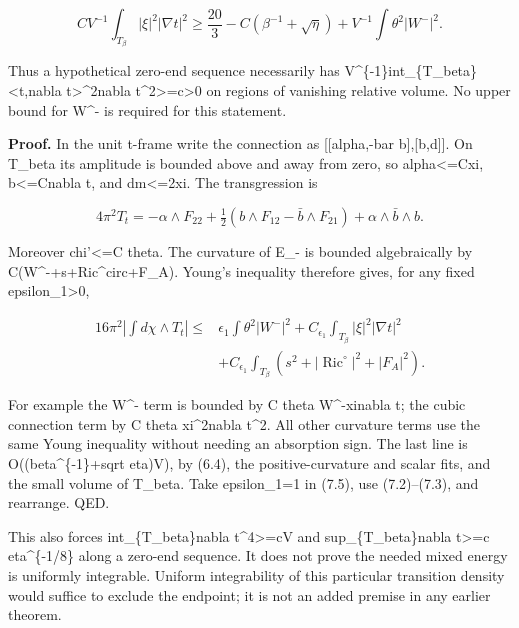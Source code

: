 \documentclass[
  10pt,
]{article}
\begin{document}
\[
 \boxed{C V^{-1}\int_{T_\beta}|\xi|^2|\nabla t|^2
    \ge\frac{20}{3}-C(\beta^{-1}+\sqrt\eta)
                          +V^{-1}\int\theta^2|W^-|^2.}          \tag{7.4}
\]

Thus a hypothetical zero-end sequence necessarily has
V\^{}\{-1\}int\_\{T\_beta\}\textbar\textless t,nabla
t\textgreater\textbar\^{}2\textbar nabla
t\textbar\^{}2\textgreater=c\textgreater0 on regions of vanishing
relative volume. No upper bound for W\^{}- is required for this
statement.

\textbf{Proof.} In the unit t-frame write the connection as
{[}{[}alpha,-bar b{]},{[}b,d{]}{]}. On T\_beta its amplitude is bounded
above and away from zero, so
\textbar alpha\textbar\textless=C\textbar xi\textbar,
\textbar b\textbar\textless=C\textbar nabla t\textbar, and
\textbar dm\textbar\textless=2\textbar xi\textbar. The transgression is

\[
 4\pi^2T_t=-\alpha\wedge F_{22}
   +\tfrac12(b\wedge F_{12}-\bar b\wedge F_{21})
   +\alpha\wedge\bar b\wedge b.
\]

Moreover \textbar chi'\textbar\textless=C theta. The curvature of E\_-
is bounded algebraically by
C(\textbar W\^{}-\textbar+\textbar s\textbar+\textbar Ric\^{}circ\textbar+\textbar F\_A\textbar).
Young's inequality therefore gives, for any fixed
epsilon\_1\textgreater0,

\[
\begin{aligned}
16\pi^2\left|\int d\chi\wedge T_t\right|
 \le{}&\epsilon_1\int\theta^2|W^-|^2
       +C_{\epsilon_1}\int_{T_\beta}|\xi|^2|\nabla t|^2\\
      &+C_{\epsilon_1}\int_{T_\beta}
              (s^2+|\operatorname{Ric}^{\circ}|^2+|F_A|^2).
\end{aligned}                                                     \tag{7.5}
\]

For example the W\^{}- term is bounded by C theta
\textbar W\^{}-\textbar\textbar xi\textbar\textbar nabla t\textbar; the
cubic connection term by C theta \textbar xi\textbar\^{}2\textbar nabla
t\textbar\^{}2. All other curvature terms use the same Young inequality
without needing an absorption sign. The last line is
O((beta\^{}\{-1\}+sqrt eta)V), by (6.4), the positive-curvature and
scalar fits, and the small volume of T\_beta. Take epsilon\_1=1 in
(7.5), use (7.2)--(7.3), and rearrange. QED.

This also forces int\_\{T\_beta\}\textbar nabla
t\textbar\^{}4\textgreater=cV and sup\_\{T\_beta\}\textbar nabla
t\textbar\textgreater=c eta\^{}\{-1/8\} along a zero-end sequence. It
does not prove the needed mixed energy is uniformly integrable. Uniform
integrability of this particular transition density would suffice to
exclude the endpoint; it is not an added premise in any earlier theorem.
\end{document}
